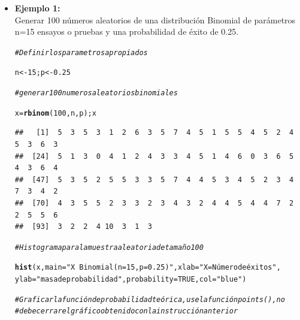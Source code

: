 \documentclass[12pt,letterpaper]{article}\usepackage[]{graphicx}\usepackage[]{color}
\makeatletter
\newcommand{\hlnum}[1]{\textcolor[rgb]{0.686,0.059,0.569}{#1}}%
\newcommand{\hlstr}[1]{\textcolor[rgb]{0.192,0.494,0.8}{#1}}%
\newcommand{\hlcom}[1]{\textcolor[rgb]{0.678,0.584,0.686}{\textit{#1}}}%
\newcommand{\hlstd}[1]{\textcolor[rgb]{0.345,0.345,0.345}{#1}}%
\newcommand{\hlkwb}[1]{\textcolor[rgb]{0.69,0.353,0.396}{#1}}%
\newcommand{\hlkwc}[1]{\textcolor[rgb]{0.333,0.667,0.333}{#1}}%
\newcommand{\hlkwd}[1]{\textcolor[rgb]{0.737,0.353,0.396}{\textbf{#1}}}%
\newenvironment{kframe}{%
 \def\at@end@of@kframe{}%
 \ifinner\ifhmode%
  \def\at@end@of@kframe{\end{minipage}}%
  \begin{minipage}{\columnwidth}%
 \fi\fi%
 \def\FrameCommand##1{\hskip\@totalleftmargin \hskip-\fboxsep
 \colorbox{shadecolor}{##1}\hskip-\fboxsep
     \hskip-\linewidth \hskip-\@totalleftmargin \hskip\columnwidth}%
 \MakeFramed {\advance\hsize-\width
   \@totalleftmargin\z@ \linewidth\hsize
   \@setminipage}}%
 {\par\unskip\endMakeFramed%
 \at@end@of@kframe}
\newenvironment{knitrout}{}{} %
\makeatother
\begin{document}
\begin{itemize}
\item \textbf{Ejemplo 1:}\\
Generar 100 n\'umeros aleatorios de una distribuci\'on Binomial de par\'ametros n=15 ensayos o pruebas y una probabilidad de \'exito de 0.25.
\begin{knitrout}
\color{fgcolor}\begin{kframe}
\begin{alltt}
\hlcom{# Definir los parametros apropiados}

\hlstd{n} \hlkwb{<-} \hlnum{15}\hlstd{; p} \hlkwb{<-} \hlnum{0.25}

\hlcom{# generar 100 numeros aleatorios binomiales}

\hlstd{x} \hlkwb{=} \hlkwd{rbinom}\hlstd{(}\hlnum{100}\hlstd{, n, p); x}
\end{alltt}
\begin{verbatim}
##   [1]  5  3  5  3  1  2  6  3  5  7  4  5  1  5  5  4  5  2  4  5  3  6  3
##  [24]  5  1  3  0  4  1  2  4  3  3  4  5  1  4  6  0  3  6  5  4  3  6  4
##  [47]  5  3  5  2  5  5  3  3  5  7  4  4  5  3  4  5  2  3  4  7  3  4  2
##  [70]  4  3  5  5  2  3  3  2  3  4  3  2  4  4  5  4  4  7  2  2  5  5  6
##  [93]  3  2  2  4 10  3  1  3
\end{verbatim}
\begin{alltt}
\hlcom{# Histograma para la muestra aleatoria de tamaño 100}

\hlkwd{hist}\hlstd{(x,} \hlkwc{main}\hlstd{=}\hlstr{"X ~ Binomial(n=15, p=0.25)"}\hlstd{,} \hlkwc{xlab}\hlstd{=}\hlstr{"X = Número de éxitos"}\hlstd{,}
\hlkwc{ylab}\hlstd{=}\hlstr{"masa de probabilidad"}\hlstd{,} \hlkwc{probability}\hlstd{=}\hlnum{TRUE}\hlstd{,} \hlkwc{col}\hlstd{=}\hlstr{"blue"}\hlstd{)}

\hlcom{# Graficar la función de probabilidad teórica, use la función points(), no }
\hlcom{# debe cerrar el gráfico obtenido con la instrucción anterior}


\end{alltt}
\end{kframe}
\end{knitrout}
\end{itemize}
\end{document}
